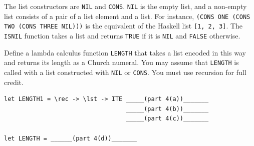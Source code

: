 \documentclass[addpoints]{exam}
\begin{document}
\begin{questions}
The list constructors are \texttt{NIL} and \texttt{CONS}.  \texttt{NIL} is the empty list, and a non-empty list consists of a pair of a list element and a list.  For instance, \texttt{(CONS ONE (CONS TWO (CONS THREE NIL)))} is the equivalent of the Haskell list \texttt{[1, 2, 3]}.  The \texttt{ISNIL} function takes a list and returns \texttt{TRUE} if it is \texttt{NIL} and \texttt{FALSE} otherwise.

Define a lambda calculus function \texttt{LENGTH} that takes a list encoded in this way and returns its length as a Church numeral.  You may assume that \texttt{LENGTH} is called with a list constructed with \texttt{NIL} or \texttt{CONS}.  You must use recursion for full credit.

\begin{verbatim}
let LENGTH1 = \rec -> \lst -> ITE _____(part 4(a))_______
                                  _____(part 4(b))_______
                                  _____(part 4(c))_______
                      
let LENGTH = ______(part 4(d))_______
\end{verbatim}



\end{questions}
\end{document}
